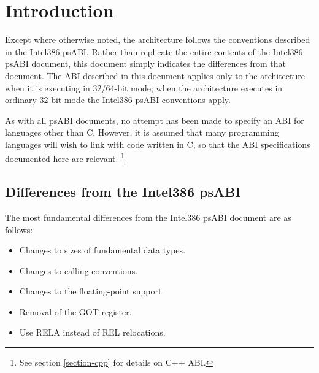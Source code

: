 \chapter{Introduction}

Except where otherwise noted, the \xARCH architecture follows the
conventions described in the Intel386 psABI.  Rather than replicate
the entire contents of the Intel386 psABI document, this document
simply indicates the differences from that document.  The ABI
described in this document applies only to the \xARCH architecture
when it is executing in 32/64-bit mode; when the architecture executes
in ordinary 32-bit mode the Intel386 psABI conventions apply.

As with all psABI documents, no attempt has been made to specify an
ABI for languages other than C.  However, it is assumed that many
programming languages will wish to link with code written in C, so
that the ABI specifications documented here are relevant.%
\footnote{See section \ref{section-cpp} for details on C++ ABI.}

\section{Differences from the Intel386 psABI}

The most fundamental differences from the Intel386 psABI document
are as follows:
\begin{itemize}
\item Changes to sizes of fundamental data types.
\item Changes to calling conventions.
\item Changes to the floating-point support.
\item Removal of the GOT register.
\item Use RELA instead of REL relocations.
\end{itemize}

